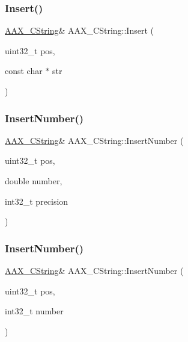 \mbox{\label{a01573_a5a5feb73f4187fddc7da0d1d8d821468}} 
\subsubsection{\texorpdfstring{Insert()}{Insert()}\hspace{0.1cm}{\footnotesize\ttfamily [2/2]}}
{\footnotesize\ttfamily \mbox{\hyperlink{a01573}{A\+A\+X\+\_\+\+C\+String}}\& A\+A\+X\+\_\+\+C\+String\+::\+Insert (\begin{DoxyParamCaption}\item[{uint32\+\_\+t}]{pos,  }\item[{const char $\ast$}]{str }\end{DoxyParamCaption})}

\mbox{\label{a01573_a4657b3b7b319a76dc6e0a2c0fd9f15f1}} 
\subsubsection{\texorpdfstring{InsertNumber()}{InsertNumber()}\hspace{0.1cm}{\footnotesize\ttfamily [1/2]}}
{\footnotesize\ttfamily \mbox{\hyperlink{a01573}{A\+A\+X\+\_\+\+C\+String}}\& A\+A\+X\+\_\+\+C\+String\+::\+Insert\+Number (\begin{DoxyParamCaption}\item[{uint32\+\_\+t}]{pos,  }\item[{double}]{number,  }\item[{int32\+\_\+t}]{precision }\end{DoxyParamCaption})}

\mbox{\label{a01573_a75f4b0d92de2f70405a115ff32546d99}} 
\subsubsection{\texorpdfstring{InsertNumber()}{InsertNumber()}\hspace{0.1cm}{\footnotesize\ttfamily [2/2]}}
{\footnotesize\ttfamily \mbox{\hyperlink{a01573}{A\+A\+X\+\_\+\+C\+String}}\& A\+A\+X\+\_\+\+C\+String\+::\+Insert\+Number (\begin{DoxyParamCaption}\item[{uint32\+\_\+t}]{pos,  }\item[{int32\+\_\+t}]{number }\end{DoxyParamCaption})}

